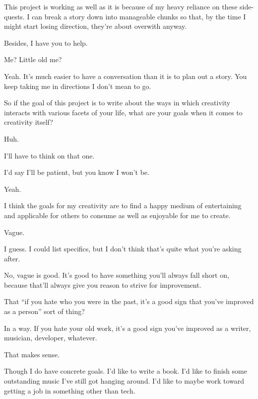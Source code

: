 \begin{paracol}{2}
\begin{leftcolumn}
This project is working as well as it is because of my heavy reliance on these side-quests. I can break a story down into manageable chunks so that, by the time I might start losing direction, they're about overwith anyway.

Besides, I have you to help.

\begin{ally}
Me? Little old me?
\end{ally}
Yeah. It's much easier to have a conversation than it is to plan out a story. You keep taking me in directions I don't mean to go.
\newpage

\begin{ally}
So if the goal of this project is to write about the ways in which creativity interacts with various facets of your life, what are your goals when it comes to creativity itself?
\end{ally}
Huh.

I'll have to think on that one.

\begin{ally}
I'd say I'll be patient, but you know I won't be.
\end{ally}
Yeah.

I think the goals for my creativity are to find a happy medium of entertaining and applicable for others to consume as well as enjoyable for me to create.

\begin{ally}
Vague.
\end{ally}
I guess. I could list specifics, but I don't think that's quite what you're asking after.

\begin{ally}
No, vague is good. It's good to have something you'll always fall short on, because that'll always give you reason to strive for improvement.
\end{ally}
That ``if you hate who you were in the past, it's a good sign that you've improved as a person'' sort of thing?

\begin{ally}
In a way. If you hate your old work, it's a good sign you've improved as a writer, musician, developer, whatever.
\end{ally}
That makes sense.

Though I do have concrete goals. I'd like to write a book. I'd like to finish some outstanding music I've still got hanging around. I'd like to maybe work toward getting a job in something other than tech.


\end{leftcolumn}
\end{paracol}
